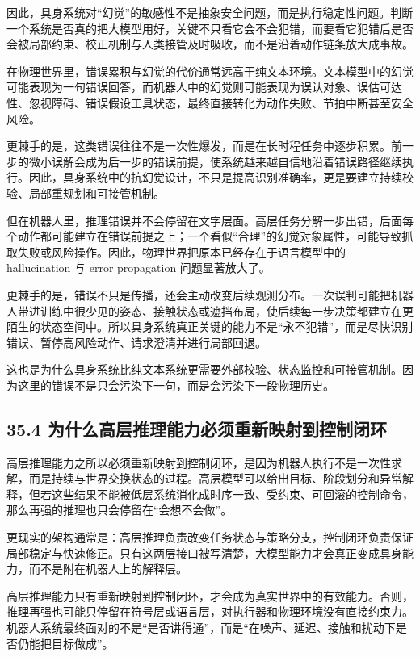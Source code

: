 因此，具身系统对“幻觉”的敏感性不是抽象安全问题，而是执行稳定性问题。判断一个系统是否真的把大模型用好，关键不只看它会不会犯错，而要看它犯错后是否会被局部约束、校正机制与人类接管及时吸收，而不是沿着动作链条放大成事故。

在物理世界里，错误累积与幻觉的代价通常远高于纯文本环境。文本模型中的幻觉可能表现为一句错误回答，而机器人中的幻觉则可能表现为误认对象、误估可达性、忽视障碍、错误假设工具状态，最终直接转化为动作失败、节拍中断甚至安全风险。

更棘手的是，这类错误往往不是一次性爆发，而是在长时程任务中逐步积累。前一步的微小误解会成为后一步的错误前提，使系统越来越自信地沿着错误路径继续执行。因此，具身系统中的抗幻觉设计，不只是提高识别准确率，更是要建立持续校验、局部重规划和可接管机制。

但在机器人里，推理错误并不会停留在文字层面。高层任务分解一步出错，后面每个动作都可能建立在错误前提之上；一个看似“合理”的幻觉对象属性，可能导致抓取失败或风险操作。因此，物理世界把原本已经存在于语言模型中的 hallucination 与 error propagation 问题显著放大了。

更棘手的是，错误不只是传播，还会主动改变后续观测分布。一次误判可能把机器人带进训练中很少见的姿态、接触状态或遮挡布局，使后续每一步决策都建立在更陌生的状态空间中。所以具身系统真正关键的能力不是“永不犯错”，而是尽快识别错误、暂停高风险动作、请求澄清并进行局部回退。

这也是为什么具身系统比纯文本系统更需要外部校验、状态监控和可接管机制。因为这里的错误不是只会污染下一句，而是会污染下一段物理历史。

\subsection*{35.4 为什么高层推理能力必须重新映射到控制闭环}


高层推理能力之所以必须重新映射到控制闭环，是因为机器人执行不是一次性求解，而是持续与世界交换状态的过程。高层模型可以给出目标、阶段划分和异常解释，但若这些结果不能被低层系统消化成时序一致、受约束、可回滚的控制命令，那么再强的推理也只会停留在“会想不会做”。

更现实的架构通常是：高层推理负责改变任务状态与策略分支，控制闭环负责保证局部稳定与快速修正。只有这两层接口被写清楚，大模型能力才会真正变成具身能力，而不是附在机器人上的解释层。

高层推理能力只有重新映射到控制闭环，才会成为真实世界中的有效能力。否则，推理再强也可能只停留在符号层或语言层，对执行器和物理环境没有直接约束力。机器人系统最终面对的不是“是否讲得通”，而是“在噪声、延迟、接触和扰动下是否仍能把目标做成”。

